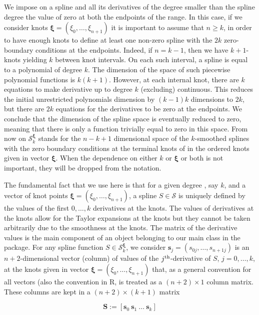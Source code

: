 We impose on a spline and all its derivatives of the {  degree}  smaller than the spline {  degree}  the value of zero at both the endpoints of the range. 
In this case, if we consider knots $\boldsymbol \xi=(\xi_{0},\dots, \xi_{n+1})$
it is important to assume that  $n\ge k$, in order to have enough knots to define at least one non-zero spline with the $2k$ zero-boundary conditions at the endpoints.
Indeed, if $n=k-1$, then we have $k+1$-knots yielding $k$ between knot intervals. 
On each such interval, a spline is equal to a polynomial of {  degree}  $k$.
The dimension of the space of such piecewise polynomial functions is $k(k+1)$. However, at each internal knot, there are $k$ equations to make derivative up to {  degree}  $k$ (excluding) continuous. 
This reduces the initial unrestricted polynomials dimension by $(k-1)k$ dimensions to $2k$, but there are $2k$ equations for the derivatives to be zero at the endpoints.
We conclude that the dimension of the spline space is eventually reduced to zero, meaning that there is only a function trivially equal to zero in this space.
From now on $\mathcal S^{\boldsymbol \xi}_{ k}$ stands for the $n-k+1$ dimensional space of the $k$-smoothed splines with the zero boundary conditions at the terminal knots of in the ordered knots given in vector $\boldsymbol \xi$.
When the dependence on either $k$ or $\boldsymbol \xi$ or both is not important, they will be dropped from the notation. 


The fundamental fact that we use here is that for a given {  degree} , say $k$, and a vector of knot points $\boldsymbol \xi=\left(\xi_0,\dots, \xi_{n+1}\right)$, a spline $S\in \mathcal S$ is uniquely defined by the values of the first $0,\dots, k$ derivatives at the knots.
The values of derivatives at the knots allow for the Taylor expansions at the knots but they cannot be taken arbitrarily due to the smoothness at the knots.   
The matrix of the derivative values is the main component of an object belonging to our main class in the package.
For any spline function $S\in \mathcal S_k^{\boldsymbol \xi}$, we consider $\mathbf s_j=(s_{0j},\dots, s_{n+1j})$ is an $n+2$-dimensional  vector (column) of values of the $j^{\rm th}$-derivative of $S$, $j=0,\dots, k$, at the knots given in vector $\boldsymbol \xi= \left(\xi_0,\dots, \xi_{n+1}\right)$ that, as a general convention for all vectors (also the convention in R,  is treated as a $(n+2)\times 1$ column matrix. 
These columns are kept in a $(n+2)\times (k+1)$ matrix 

\begin{equation}
\label{eq:spmat}
\mathbf{S} := \left[ \mathbf{s}_0\ \mathbf{s}_1\ \dots\ \mathbf{s}_k \right]
\end{equation}



